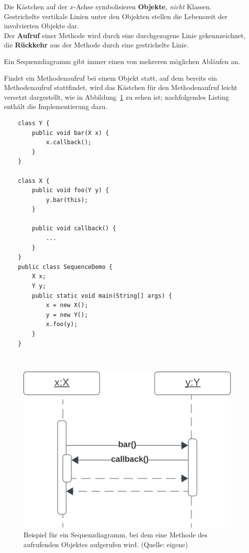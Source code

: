 \noindent
Die Kästchen auf der $x$-Achse symbolisieren \textbf{Objekte}, \textit{nicht} Klassen.\\

\noindent
Gestrichelte vertikale Linien unter den Objekten stellen die Lebenszeit der involvierten Objekte dar.\\

\noindent
Der \textbf{Aufruf} einer Methode wird durch eine durchgezogene Linie gekennzeichnet, die \textbf{Rückkehr} aus der Methode durch eine
gestrichelte Linie.

\begin{tcolorbox}[enlarge top by=0.5cm,enlarge bottom by=0.5cm]
Ein Sequenzdiagramm gibt immer einen von mehreren möglichen Abläufen an.\\
\end{tcolorbox}


\noindent
Findet ein Methodenaufruf bei einem Objekt statt, auf dem bereits ein Methodenaufruf stattfindet, wird das Kästchen für den Methodenaufruf leicht versetzt dargestellt, wie in Abbildung~\ref{fig:callback} zu sehen ist; nachfolgendes Listing enthält die Implementierung dazu.

\begin{verbatim}
    class Y {
        public void bar(X x) {
            x.callback();
        }
    }

    class X {
        public void foo(Y y) {
            y.bar(this);
        }

        public void callback() {
            ...
        }
    }
    public class SequenceDemo {
        X x;
        Y y;
        public static void main(String[] args) {
            x = new X();
            y = new Y();
            x.foo(y);
        }
    }
\end{verbatim}\\

\begin{figure}
    \centering
    \includegraphics[scale=0.5]{chapters/fopt3/img/callback}
    \caption{Beispiel für ein Sequenzdiagramm, bei dem eine Methode des aufrufenden Objektes aufgerufen wird. (Quelle: eigene)}
    \label{fig:callback}
\end{figure}

